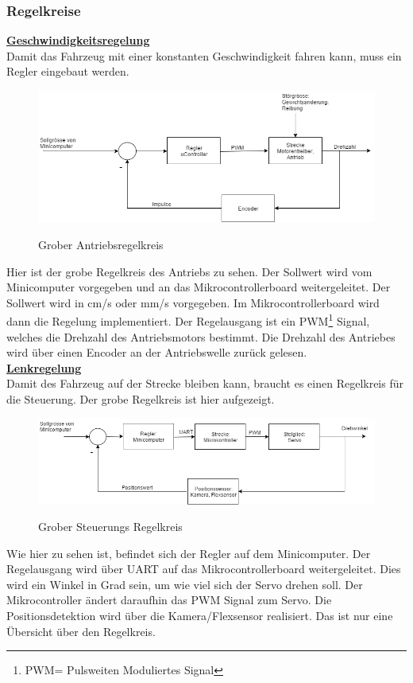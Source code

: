 \subsubsection{Regelkreise}
\underline{\textbf{Geschwindigkeitsregelung}}\\[0.2cm]
Damit das Fahrzeug mit einer konstanten Geschwindigkeit fahren kann, muss ein Regler eingebaut werden.
\begin{figure}[H]
	\centering
	\includegraphics[width=1\textwidth]{03_Loesungskonzept/pictures/Gesch_Regelung.png}
	\label{Regelung_Gesch}
	\caption{Grober Antriebsregelkreis}
\end{figure}\flushleft
Hier ist der grobe Regelkreis des Antriebs zu sehen. Der Sollwert wird vom Minicomputer vorgegeben und an das Mikrocontrollerboard weitergeleitet. Der Sollwert wird in cm/s oder mm/s vorgegeben. Im Mikrocontrollerboard wird dann die Regelung implementiert. Der Regelausgang ist ein PWM\footnote{PWM= Pulsweiten Moduliertes Signal} Signal, welches die Drehzahl des Antriebsmotors bestimmt. Die Drehzahl des Antriebes wird über einen Encoder an der Antriebswelle zurück gelesen.\\[0.2cm]
\underline{\textbf{Lenkregelung}}\\[0.2cm]
Damit des Fahrzeug auf der Strecke bleiben kann, braucht es einen Regelkreis für die Steuerung. Der grobe Regelkreis ist hier aufgezeigt.
\begin{figure}[H]
	\centering
	\includegraphics[width=1\textwidth]{03_Loesungskonzept/pictures/Lenk_Regelung.png}
	\label{Regelung_Lenken}
	\caption{Grober Steuerungs Regelkreis }
\end{figure}\flushleft
Wie hier zu sehen ist, befindet sich der Regler auf dem Minicomputer. Der Regelausgang wird über UART auf das Mikrocontrollerboard weitergeleitet. Dies wird ein Winkel in Grad sein, um wie viel sich der Servo drehen soll. Der Mikrocontroller ändert daraufhin das PWM Signal zum Servo. Die Positionsdetektion wird über die Kamera/Flexsensor realisiert. Das ist nur eine Übersicht über den Regelkreis.
